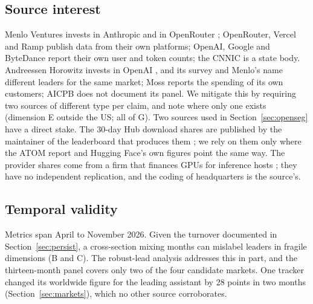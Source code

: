 \documentclass[11pt]{article}
\begin{document}
\subsection{Source interest} Menlo Ventures invests in Anthropic and in OpenRouter \cite{menlo2026state}; OpenRouter, Vercel and Ramp publish data from their own platforms; OpenAI, Google and ByteDance report their own user and token counts; the CNNIC is a state body. Andreessen Horowitz invests in OpenAI \cite{a16z2026cio}, and its survey and Menlo's name different leaders for the same market; Moss reports the spending of its own customers; AICPB does not document its panel. We mitigate this by requiring two sources of different type per claim, and note where only one exists (dimension E outside the US; all of G). Two sources used in Section~\ref{sec:openseg} have a direct stake. The 30-day Hub download shares are published by the maintainer of the leaderboard that produces them \cite{vidraft2026top300}; we rely on them only where the ATOM report and Hugging Face's own figures point the same way. The provider shares come from a firm that finances GPUs for inference hosts \cite{amcompute2026providers}; they have no independent replication, and the coding of headquarters is the source's.

\subsection{Temporal validity} Metrics span April to November 2026. Given the turnover documented in Section~\ref{sec:persist}, a cross-section mixing months can mislabel leaders in fragile dimensions (B and C). The robust-lead analysis addresses this in part, and the thirteen-month panel covers only two of the four candidate markets. One tracker changed its worldwide figure for the leading assistant by 28 points in two months (Section~\ref{sec:markets}), which no other source corroborates.
\end{document}
